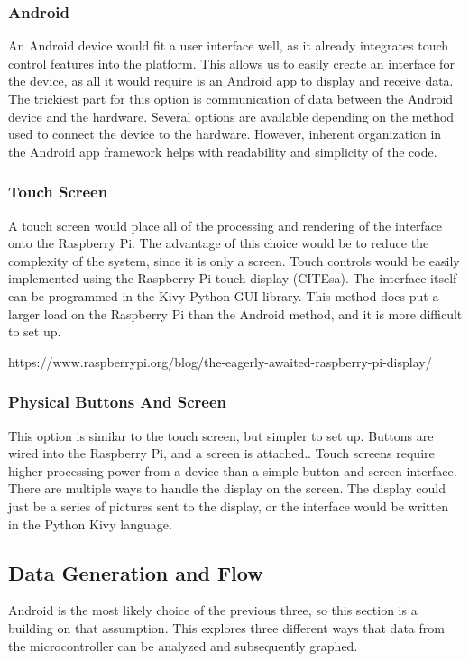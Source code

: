 \documentclass[draftclsnofoot,onecolumn,letterpaper,10pt]{IEEEtran}
\begin{document}
\subsubsection{Android}
An Android device would fit a user interface well, as it already integrates touch control features into the platform.
This allows us to easily create an interface for the device, as all it would require is an Android app to display and receive data.
The trickiest part for this option is communication of data between the Android device and the hardware.
Several options are available depending on the method used to connect the device to the hardware.
However, inherent organization in the Android app framework helps with readability and simplicity of the code.

\subsubsection{Touch Screen}
A touch screen would place all of the processing and rendering of the interface onto the Raspberry Pi.
The advantage of this choice would be to reduce the complexity of the system, since it is only a screen.
Touch controls would be easily implemented using the Raspberry Pi touch display (CITEsa).
The interface itself can be programmed in the Kivy Python GUI library.
This method does put a larger load on the Raspberry Pi than the Android method, and it is more difficult to set up.

https://www.raspberrypi.org/blog/the-eagerly-awaited-raspberry-pi-display/ 

\subsubsection{Physical Buttons And Screen}
This option is similar to the touch screen, but simpler to set up.
Buttons are wired into the Raspberry Pi, and a screen is attached..
Touch screens require higher processing power from a device than a simple button and screen interface.
There are multiple ways to handle the display on the screen.
The display could just be a series of pictures sent to the display, or the interface would be written in the Python Kivy language.


\subsection{Data Generation and Flow}
Android is the most likely choice of the previous three, so this section is a building on that assumption.
This explores three different ways that data from the microcontroller can be analyzed and subsequently graphed.
\end{document}
